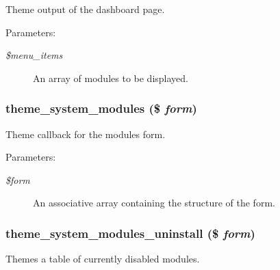 Theme output of the dashboard page.

\begin{Desc}
\item[Parameters:]
\begin{description}
\item[{\em \$menu\_\-items}]An array of modules to be displayed. \end{description}
\end{Desc}
\hypertarget{group__themeable_gdb0103cb92abf4193ad367528d1d060a}{
\subsubsection[{theme\_\-system\_\-modules}]{\setlength{\rightskip}{0pt plus 5cm}theme\_\-system\_\-modules (\$ {\em form})}}
\label{group__themeable_gdb0103cb92abf4193ad367528d1d060a}


Theme callback for the modules form.

\begin{Desc}
\item[Parameters:]
\begin{description}
\item[{\em \$form}]An associative array containing the structure of the form. \end{description}
\end{Desc}
\hypertarget{group__themeable_g662b8055bb00efdbfc372a42fb967ac6}{
\subsubsection[{theme\_\-system\_\-modules\_\-uninstall}]{\setlength{\rightskip}{0pt plus 5cm}theme\_\-system\_\-modules\_\-uninstall (\$ {\em form})}}
\label{group__themeable_g662b8055bb00efdbfc372a42fb967ac6}


Themes a table of currently disabled modules.


